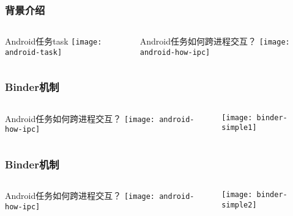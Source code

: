\begin{frame}[fragile]
	\frametitle{背景介绍}
	
	\begin{columns}
		\begin{column}{.5\textwidth}
			Android任务task
			\texttt{[image: android-task]}
			
		\end{column}
		\begin{column}{.5\textwidth}
			Android任务如何跨进程交互？
			\texttt{[image: android-how-ipc]}
			
		\end{column}
	\end{columns}
\end{frame}


\begin{frame}[fragile]
	\frametitle{Binder机制}
	
	\begin{columns}
		\begin{column}{.5\textwidth}
			Android任务如何跨进程交互？
			\texttt{[image: android-how-ipc]}
			
		\end{column}
		\begin{column}{.5\textwidth}
			
			\texttt{[image: binder-simple1]}
			
		\end{column}
	\end{columns}
\end{frame}


\begin{frame}[fragile]
	\frametitle{Binder机制}
	
	\begin{columns}
		\begin{column}{.5\textwidth}
			Android任务如何跨进程交互？
			\texttt{[image: android-how-ipc]}
			
		\end{column}
		\begin{column}{.5\textwidth}
			
			\texttt{[image: binder-simple2]}
			
		\end{column}
	\end{columns}
\end{frame}


